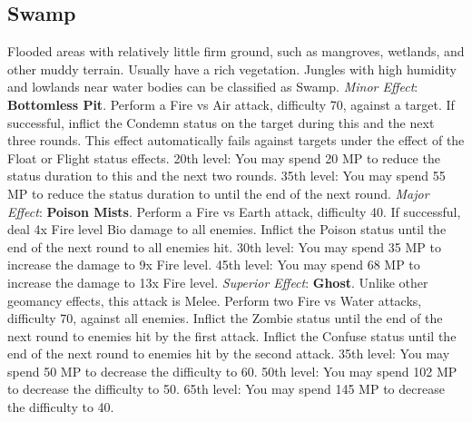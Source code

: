\begin{multicols}{2}
\subsection{Swamp}
\label{subsec:geo-swamp}
Flooded areas with relatively little firm ground, such as mangroves, wetlands, and other muddy terrain. Usually have a rich vegetation. Jungles with high humidity and lowlands near water bodies can be classified as Swamp.
\textit{Minor Effect}: \textbf{Bottomless Pit}. Perform a Fire vs Air attack, difficulty 70, against a target. If successful, inflict the Condemn status on the target during this and the next three rounds. This effect automatically fails against targets under the effect of the Float or Flight status effects. 20th level: You may spend 20 MP to reduce the status duration to this and the next two rounds. 35th level: You may spend 55 MP to reduce the status duration to until the end of the next round.
\textit{Major Effect}: \textbf{Poison Mists}. Perform a Fire vs Earth attack, difficulty 40. If successful, deal 4x Fire level Bio damage to all enemies. Inflict the Poison status until the end of the next round to all enemies hit. 30th level: You may spend 35 MP to increase the damage to 9x Fire level. 45th level: You may spend 68 MP to increase the damage to 13x Fire level.
\textit{Superior Effect}: \textbf{Ghost}. Unlike other geomancy effects, this attack is Melee. Perform two Fire vs Water attacks, difficulty 70, against all enemies. Inflict the Zombie status until the end of the next round to enemies hit by the first attack. Inflict the Confuse status until the end of the next round to enemies hit by the second attack. 35th level: You may spend 50 MP to decrease the difficulty to 60. 50th level: You may spend 102 MP to decrease the difficulty to 50. 65th level: You may spend 145 MP to decrease the difficulty to 40.


\end{multicols}
